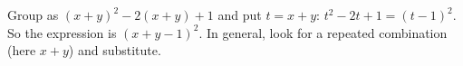 Group as $(x+y)^2-2(x+y)+1$ and put $t=x+y$: $t^2-2t+1=(t-1)^2$. So the expression is $\boxed{(x+y-1)^2}$. In general, look for a repeated combination (here $x+y$) and substitute.
